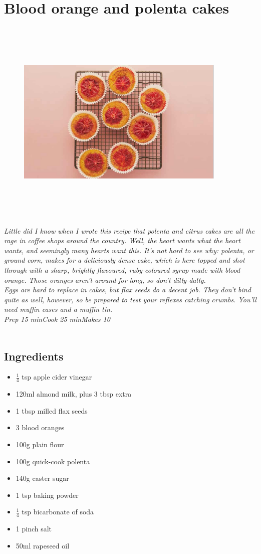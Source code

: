 \documentclass{book}
\begin{document}
\section{Blood orange and polenta cakes}
\begin{figure}
\centering\includegraphics[width=10cm,height=10cm,keepaspectratio]{Recipe_Pictures/Blood_orange_and_polenta_cakes.png}
\end{figure}
\emph{Little did I know when I wrote this recipe that polenta and citrus cakes are all the rage in coffee shops around the country. Well, the heart wants what the heart wants, and seemingly many hearts want this. It’s not hard to see why: polenta, or ground corn, makes for a deliciously dense cake, which is here topped and shot through with a sharp, brightly flavoured, ruby-coloured syrup made with blood orange. Those oranges aren’t around for long, so don’t dilly-dally.\\ 
Eggs are hard to replace in cakes, but flax seeds do a decent job. They don’t bind quite as well, however, so be prepared to test your reflexes catching crumbs. You’ll need muffin cases and a muffin tin.\\ 
Prep 15 minCook 25 minMakes 10 }\\\\ 
\subsection*{Ingredients}
\begin{itemize}
\item $\frac{1}{4}$ tsp apple cider vinegar 
\item 120ml almond milk, plus 3 tbsp extra 
\item 1 tbsp milled flax seeds
\item 3 blood oranges
\item 100g plain flour 
\item 100g quick-cook polenta 
\item 140g caster sugar
\item 1 tsp baking powder 
\item $\frac{1}{4}$ tsp bicarbonate of soda
\item 1 pinch salt 
\item 50ml rapeseed oil
\end{itemize}
\end{document}
